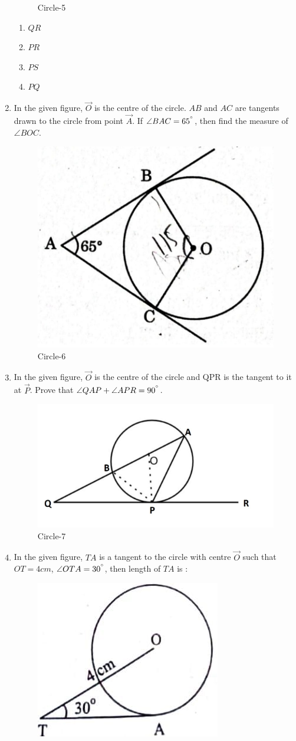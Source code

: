 \documentclass{article}
\begin{document}
\begin{enumerate}
\begin{figure}[h!]
			\caption{Circle-5}
			\label{fig:circle}
		\end{figure}
		\begin{enumerate}
			\item $ QR $
			\item $ PR $
			\item $ PS $
			\item $ PQ $
		\end{enumerate}
	\item In the given figure, $ \vec{O} $ is the centre of the circle. $ AB $ and $ AC $ are tangents drawn to the circle from point $ \vec{A} $. If $ \angle{BAC} = 65^{\degree} $, then find the measure of $ \angle{BOC} $.
		\begin{figure}[h!]
			\centering
			\includegraphics[width=0.35\columnwidth]{fig7.jpg}
			\caption{Circle-6}
			\label{fig:crcle}
		\end{figure}
	\item In the given figure, $ \vec{O} $ is the centre of the circle and QPR is the tangent to it at $ \vec{P} $. Prove that $ \angle{QAP} + \angle{APR} = 90^{\degree} $.
		\begin{figure}[h!]
			\centering
			\includegraphics[width=0.5\columnwidth]{fig8.jpg}
			\caption{Circle-7}
			\label{fig:circle}
		\end{figure}
	\item In the given figure, $ TA $ is a tangent to the circle with centre $ \vec{O} $ such that $ OT = 4 cm $, $ \angle{OTA} = 30^{\degree} $, then length of $ TA $ is :
		\begin{figure}[h!]
			\centering
			\includegraphics[width=0.35\columnwidth]{fig9.jpg}

\end{figure}
\end{enumerate}
\end{document}
